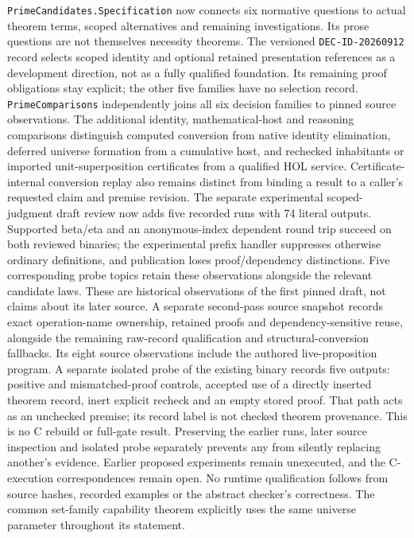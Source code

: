 \documentclass[11pt]{article}
\theoremstyle{definition}
\theoremstyle{remark}
\begin{document}
\texttt{PrimeCandidates.Specification} now connects six normative questions
to actual theorem terms, scoped alternatives and remaining investigations.
Its prose questions are not themselves necessity theorems. The versioned
\texttt{DEC-ID-20260912} record selects scoped identity and optional retained
presentation references as a development direction, not as a fully qualified
foundation. Its remaining proof obligations stay explicit; the other five
families have no selection record. \texttt{PrimeComparisons} independently
joins all six decision families to pinned source observations. The additional
identity, mathematical-host and reasoning comparisons distinguish computed
conversion from native identity elimination, deferred universe formation from
a cumulative host, and rechecked inhabitants or imported unit-superposition
certificates from a qualified HOL service. Certificate-internal conversion
replay also remains distinct from binding a result to a caller's requested
claim and premise revision. The separate experimental scoped-judgment draft
review now adds five recorded runs with 74 literal outputs. Supported beta/eta
and an anonymous-index dependent round trip succeed on both reviewed binaries;
the experimental prefix handler suppresses otherwise ordinary definitions,
and publication loses proof/dependency distinctions. Five corresponding probe
topics retain these observations alongside the relevant candidate laws.
These are historical observations of the first pinned draft, not claims
about its later source. A separate second-pass source snapshot records exact
operation-name ownership, retained proofs and dependency-sensitive reuse,
alongside the remaining raw-record qualification and structural-conversion
fallbacks. Its eight source observations include the authored live-proposition
program. A separate isolated probe of the existing binary records five
outputs: positive and mismatched-proof controls, accepted use of a directly
inserted theorem record, inert explicit recheck and an empty stored proof.
That path acts as an unchecked premise; its record label is not checked
theorem provenance. This is no C rebuild or full-gate result. Preserving the
earlier runs, later source inspection and isolated probe separately prevents
any from silently replacing another's evidence.
Earlier proposed experiments remain unexecuted, and the C-execution
correspondences remain open. No runtime qualification follows from source
hashes, recorded examples or the abstract checker's correctness.
The common set-family capability theorem explicitly uses the same universe
parameter throughout its statement.
\end{document}
